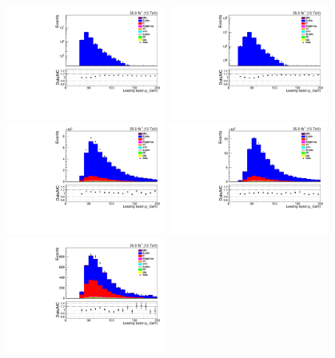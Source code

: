 \begin{figure}[h]
\centering
\includegraphics[width=0.47\textwidth]{figs/background-estimation/plots/unblinded/prompt_ee_ttbarInc/lep1Pt_NPL_ee_lepSel_ee_log.pdf}
\includegraphics[width=0.47\textwidth]{figs/background-estimation/plots/unblinded/prompt_mumu_ttbarInc/lep1Pt_NPL_mumu_lepSel_mumu_log.pdf}
\\
\includegraphics[width=0.47\textwidth]{figs/background-estimation/plots/unblinded/prompt_ee_ttbarInc/lep1Pt_NPL_ee_jetSel_ee.pdf}
\includegraphics[width=0.47\textwidth]{figs/background-estimation/plots/unblinded/prompt_mumu_ttbarInc/lep1Pt_NPL_mumu_jetSel_mumu.pdf}
\\
\includegraphics[width=0.47\textwidth]{figs/background-estimation/plots/unblinded/prompt_ee_ttbarInc/lep1Pt_NPL_ee_wMass_ee.pdf}

\end{figure}

